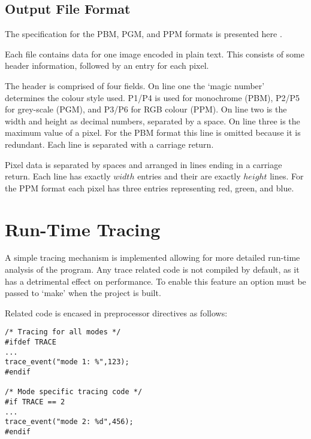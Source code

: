 

\subsection*{Output File Format}

The specification for the PBM, PGM, and PPM formats is presented here \cite{ppmspec}.

Each file contains data for one image encoded in plain text. This consists of some header information, 
followed by an entry for each pixel. 

The header is comprised of four fields. On line one the `magic number' determines the colour style used.
P1/P4 is used for monochrome (PBM), P2/P5 for grey-scale (PGM), and P3/P6 for RGB colour (PPM).
On line two is the width and height as decimal numbers, separated by a space.
On line three is the maximum value of a pixel. For the PBM format this line is omitted because it is redundant.
Each line is separated with a carriage return. 

Pixel data is separated by spaces and arranged in lines ending in a carriage return. 
Each line has exactly \(width\) entries and their are exactly \(height\) lines.
For the PPM format each pixel has three entries representing red, green, and blue.



\section{Run-Time Tracing}
\label{sec:traceimp}

A simple tracing mechanism is implemented allowing for more detailed run-time analysis of the program.
Any trace related code is not compiled by default, as it has a detrimental effect on performance. 
To enable this feature an option must be passed to `make' when the project is built.

Related code is encased in preprocessor directives as follows:

\begin{lstlisting}
/* Tracing for all modes */
#ifdef TRACE
...
trace_event("mode 1: %",123);
#endif

/* Mode specific tracing code */
#if TRACE == 2
...
trace_event("mode 2: %d",456);
#endif 
\end{lstlisting}

